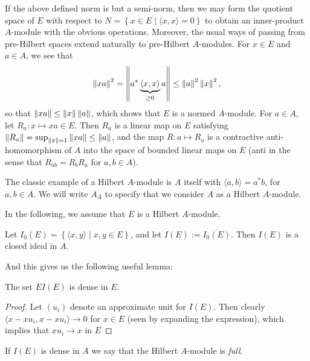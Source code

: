 If the above defined norm is but a semi-norm, then we may form the quotient space of $E$ with respect to $N=\left\{ x \in E \mid \langle x , x \rangle = 0 \right\}$ to obtain an inner-product $A$-module with the obvious operations. Moreover, the usual ways of passing from pre-Hilbert spaces extend naturally to pre-Hilbert $A$-modules. For $x \in E$ and $a \in A$, we see that
\begin{align*}
	\left\lVert x a \right\rVert^2 = \left\lVert a^* \underbrace{\langle x, x \rangle}_{\geq 0} a \right\rVert \leq \left\lVert a \right\rVert^2 \left\lVert x \right\rVert^2,
\end{align*}
so that $\left\lVert x a \right\rVert \leq \left\lVert x \right\rVert \left\lVert a \right\rVert$, which shows that $E$ is a normed $A$-module. For $a \in A$, let $R_a \colon x \mapsto xa \in E$. Then $R_a$ is a linear map on $E$ satisfying $\left\lVert R_a\right\rVert = \sup_{\left\lVert x \right\rVert = 1} \left\lVert xa \right\rVert \leq \left\lVert a \right\rVert$, and the map $R \colon a \mapsto R_a$ is a contractive anti-homomorphism of $A$ into the space of bounded linear maps on $E$ (anti in the sense that $R_{ab}=R_bR_a$ for $a,b \in A$).




\begin{example}
	The classic example of a Hilbert $A$-module is $A$ itself with $\langle a,b \rangle = a^*b$, for $a,b \in A$. We will write $A_A$ to specify that we consider $A$ as a Hilbert $A$-module.
\end{example}

In the following, we assume that $E$ is a Hilbert $A$-module.
\begin{remark}
	Let $I_0(E) = \left\{ \langle x,y \rangle \mid x,y \in E \right\}$, and let $I(E) := \overline{I_0(E)}$. Then $I(E)$ is a closed ideal in $A$. 
\end{remark}
And this gives us the following useful lemma:
\begin{lemma}
	The set $EI(E)$ is dense in $E$.
\end{lemma}
\begin{proof}
	Let $(u_i)$ denote an approximate unit for $I(E)$. Then clearly $\langle x-x u_i , x-x u_i\rangle \to 0$ for $x \in E$ (seen by expanding the expression), which implies that $x u_i \to x$ in $E$
\end{proof}
\begin{definition}
	If $I(E)$ is dense in $A$ we say that the Hilbert $A$-module is \emph{full}.
\end{definition}

